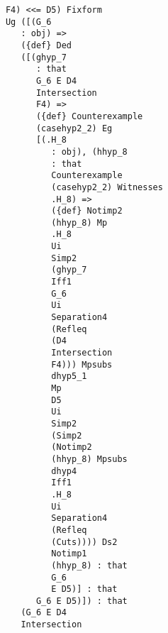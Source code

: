 \documentclass[12pt]{article}
\begin{document}
\begin{verbatim}
                               F4) <<= D5) Fixform 
                               Ug ([(G_6 
                                  : obj) => 
                                  ({def} Ded 
                                  ([(ghyp_7 
                                     : that 
                                     G_6 E D4 
                                     Intersection 
                                     F4) => 
                                     ({def} Counterexample 
                                     (casehyp2_2) Eg 
                                     [(.H_8 
                                        : obj), (hhyp_8 
                                        : that 
                                        Counterexample 
                                        (casehyp2_2) Witnesses 
                                        .H_8) => 
                                        ({def} Notimp2 
                                        (hhyp_8) Mp 
                                        .H_8 
                                        Ui 
                                        Simp2 
                                        (ghyp_7 
                                        Iff1 
                                        G_6 
                                        Ui 
                                        Separation4 
                                        (Refleq 
                                        (D4 
                                        Intersection 
                                        F4))) Mpsubs 
                                        dhyp5_1 
                                        Mp 
                                        D5 
                                        Ui 
                                        Simp2 
                                        (Simp2 
                                        (Notimp2 
                                        (hhyp_8) Mpsubs 
                                        dhyp4 
                                        Iff1 
                                        .H_8 
                                        Ui 
                                        Separation4 
                                        (Refleq 
                                        (Cuts)))) Ds2 
                                        Notimp1 
                                        (hhyp_8) : that 
                                        G_6 
                                        E D5)] : that 
                                     G_6 E D5)]) : that 
                                  (G_6 E D4 
                                  Intersection 

\end{verbatim}
\end{document}
